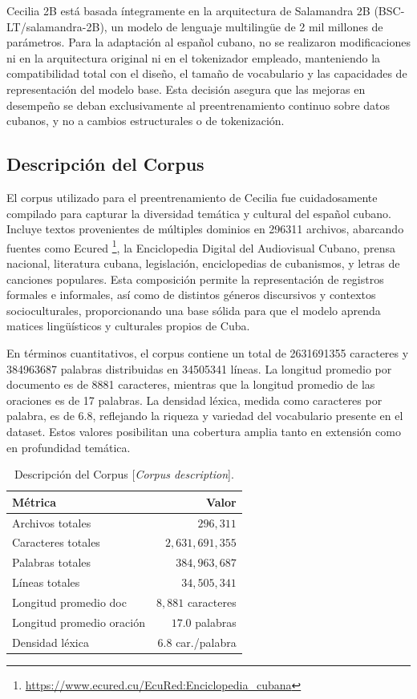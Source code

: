 \documentclass[10pt,twoside]{rcmart} %
\begin{document}
Cecilia 2B está basada íntegramente en la arquitectura de Salamandra 2B (BSC-LT/salamandra-2B), un modelo de lenguaje multilingüe de 2 mil millones de parámetros. Para la adaptación al español cubano, no se realizaron modificaciones ni en la arquitectura original ni en el tokenizador empleado, manteniendo la compatibilidad total con el diseño, el tamaño de vocabulario y las capacidades de representación del modelo base. Esta decisión asegura que las mejoras en desempeño se deban exclusivamente al preentrenamiento continuo sobre datos cubanos, y no a cambios estructurales o de tokenización.

\subsection{Descripción del Corpus}

El corpus utilizado para el preentrenamiento de Cecilia fue cuidadosamente compilado para capturar la diversidad temática y cultural del español cubano. Incluye textos provenientes de múltiples dominios en 296311 archivos, abarcando fuentes como Ecured \footnote{\url{https://www.ecured.cu/EcuRed:Enciclopedia_cubana}}, la Enciclopedia Digital del Audiovisual Cubano, prensa nacional, literatura cubana, legislación, enciclopedias de cubanismos, y letras de canciones populares. Esta composición permite la representación de registros formales e informales, así como de distintos géneros discursivos y contextos socioculturales, proporcionando una base sólida para que el modelo aprenda matices lingüísticos y culturales propios de Cuba.

En términos cuantitativos, el corpus contiene un total de 2631691355 caracteres y 384963687 palabras distribuidas en 34505341 líneas. La longitud promedio por documento es de 8881 caracteres, mientras que la longitud promedio de las oraciones es de 17 palabras. La densidad léxica, medida como caracteres por palabra, es de 6.8, reflejando la riqueza y variedad del vocabulario presente en el dataset. Estos valores posibilitan una cobertura amplia tanto en extensión como en profundidad temática.

\begin{table}[hbt]
\caption{Descripción del Corpus [\textit{Corpus description}].}
\begin{center}
\begin{tabular}{lr}\hline\hline
Métrica &  Valor \\\hline\hline
Archivos totales           & $296,311$		    \\
Caracteres totales         & $2,631,691,355$    \\
Palabras totales           & $384,963,687$		\\
Líneas totales             & $34,505,341$		\\
Longitud promedio doc      & $8,881$ caracteres \\
Longitud promedio oración  & $17.0$ palabras    \\
Densidad léxica            & $6.8$ car./palabra \\\hline\hline
\end{tabular}
\end{center}
\label{tab:corpus}
\end{table}
\end{document}

